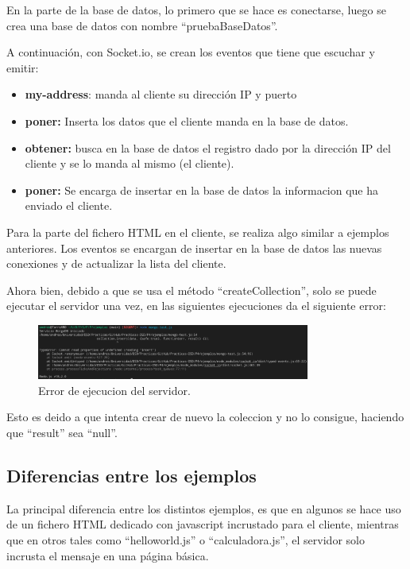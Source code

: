 \documentclass{article}
\begin{document}
En la parte de la base de datos, lo primero que se hace es conectarse, luego se crea una base de datos con nombre ``pruebaBaseDatos''.

A continuación, con Socket.io, se crean los eventos que tiene que escuchar y emitir: 

\begin{itemize}
    \item \textbf{my-address}: manda al cliente su dirección IP y puerto
    \item \textbf{poner:} Inserta los datos que el cliente manda en la base de datos.
    \item \textbf{obtener:} busca en la base de datos el registro dado por la dirección IP del cliente y se lo manda al mismo (el cliente).
    \item \textbf{poner:} Se encarga de insertar en la base de datos la informacion que ha enviado el cliente.
\end{itemize}

Para la parte del fichero HTML en el cliente, se realiza algo similar a ejemplos anteriores. Los eventos se encargan de insertar en la base de datos las nuevas conexiones y de actualizar la lista del cliente.

Ahora bien, debido a que se usa el método ``createCollection'', solo se puede ejecutar el servidor una vez, en las siguientes ejecuciones da el siguiente error:

\begin{figure}[H]
    \centering
    \includegraphics[width=0.8\textwidth]{images/errormongo.png}
    \caption{Error de ejecucion del servidor.}
\end{figure}

Esto es deido a que intenta crear de nuevo la coleccion y no lo consigue, haciendo que ``result'' sea ``null''.

\subsection{Diferencias entre los ejemplos}
La principal diferencia entre los distintos ejemplos, es que en algunos se hace uso de un fichero HTML dedicado con javascript incrustado para el cliente, mientras que en otros tales como ``helloworld.js'' o ``calculadora.js'', el servidor solo incrusta el mensaje en una página básica.
\end{document}
